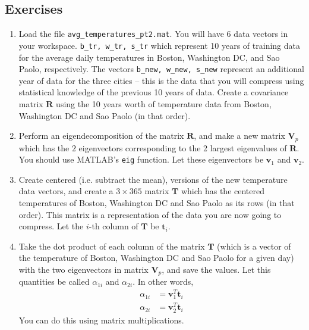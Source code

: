 \subsection{Exercises}
\begin{prob}
\begin{enumerate}
\item Load the file \texttt{avg\_temperatures\_pt2.mat}. You will have 6 data vectors in your workspace. \texttt{b\_tr, w\_tr, s\_tr}  which represent 10 years of training data for the average daily temperatures in Boston, Washington DC, and Sao Paolo, respectively. The vectors \texttt{b\_new, w\_new, s\_new} represent an additional year of data for the three cities -- this is the data that you will compress using statistical knowledge of the previous 10 years of data. Create a covariance matrix $\mathbf{R}$ using the 10 years worth of temperature data from Boston, Washington DC and Sao Paolo (in that order).

\item Perform an eigendecomposition of the matrix $\mathbf{R}$, and make a new matrix $\mathbf{V}_p$ which has the $2$ eigenvectors corresponding to the 2 largest eigenvalues of $\mathbf{R}$. You should use MATLAB's \texttt{eig} function. Let these eigenvectors be $\mathbf{v}_1$ and $\mathbf{v}_2$.

\item Create centered (i.e. subtract the mean), versions of the new temperature data vectors, and create a $3\times 365$ matrix $\mathbf{T}$ which has the centered temperatures of Boston, Washington DC and Sao Paolo as its rows (in that order). This matrix  is a representation of the data you are now going to compress. Let the $i$-th column of $\mathbf{T}$ be $\mathbf{t}_i$.

\item Take the dot product of each column of the matrix $\mathbf{T}$ (which is a vector of the temperature of Boston, Washington DC and Sao Paolo for a given day) with the two eigenvectors in matrix $\mathbf{V}_p$, and save the values.  Let this quantities be called $\alpha_{1i}$ and $\alpha_{2i}$. In other words,
    \begin{align*}
        \alpha_{1i} &= \mathbf{v}_1^T\mathbf{t}_i\\
        \alpha_{2i} &= \mathbf{v}_2^T\mathbf{t}_i
    \end{align*}
    You can do this using matrix multiplications.


\end{enumerate}
\end{prob}
